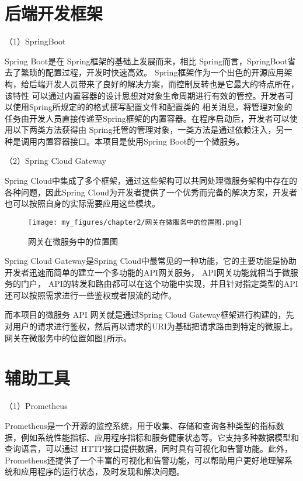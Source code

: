 \section{后端开发框架}

（1）SpringBoot


Spring Boot是在 Spring框架的基础上发展而来\cite{konggyong2015keji}，相比 Spring而言，SpringBoot省去了繁琐的配置过程，开发时快速高效。
Spring框架作为一个出色的开源应用架构，给后端开发人员带来了良好的解决方案，而控制反转也是它最大的特点所在，该特性
可以通过内置容器的设计思想对对象生命周期进行有效的管控。开发者可以使用Spring所规定的的格式撰写配置文件和配置类的
相关消息，将管理对象的任务由开发人员直接传递至Spring框架的内置容器\cite{kongqingyong201ji}。在程序启动后，开发者可以使用以下两类方法获得由
Spring托管的管理对象，一类方法是通过依赖注入，另一种是调用内置容器接口。本项目是使用Spring Boot的一个微服务。


（2）Spring Cloud Gateway

Spring Cloud中集成了多个框架，通过这些架构可以共同处理微服务架构中存在的各种问题\cite{kon2201ji}，因此Spring Cloud为开发者提供了一个优秀而完备的解决方案，开发者也可以按照自身的实际需要应用这些模块。

\begin{figure}[h]
    \centering
    \texttt{[image: my\_figures/chapter2/网关在微服务中的位置图.png]}
    \caption{网关在微服务中的位置图}
    \label{fig:/网关在微服务中的位置图}
\end{figure}

Spring Cloud Gateway是Spring Cloud中最常见的一种功能，它的主要功能是协助开发者迅速而简单的建立一个多功能的API网关服务， API网关功能就相当于微服务的门户， API的转发和路由都可以在这个功能中实现，并且针对指定类型的API还可以按照需求进行一些鉴权或者限流的动作。

而本项目的微服务 API 网关就是通过Spring Cloud Gateway框架进行构建的，先对用户的请求进行鉴权，然后再以请求的URI为基础把请求路由到特定的微服上。网关在微服务中的位置如图\ref{fig:/网关在微服务中的位置图}所示。

\section{辅助工具}

（1）Prometheus

Prometheus是一个开源的监控系统，用于收集、存储和查询各种类型的指标数据\cite{kng2562eji}，例如系统性能指标、应用程序指标和服务健康状态等。它支持多种数据模型和查询语言，可以通过
HTTP接口提供数据，同时具有可视化和告警功能。此外，Prometheus还提供了一个丰富的可视化和告警功能\cite{kongqingy2015keji}，可以帮助用户更好地理解系统和应用程序的运行状态，及时发现和解决问题。

